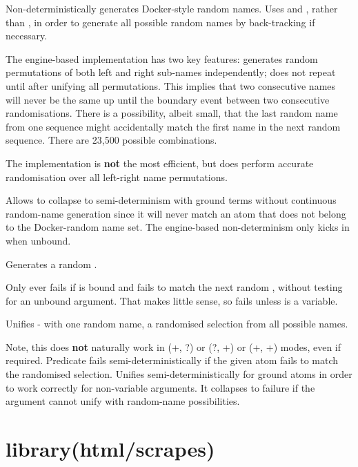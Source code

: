 \begin{description}
Non-deterministically generates Docker-style random names. Uses
 and , rather than , in
order to generate all possible random names by back-tracking if
necessary.

The engine-based implementation has two key features: generates
random permutations of both left and right sub-names independently;
does not repeat until after unifying all permutations. This implies
that two consecutive names will never be the same up until the
boundary event between two consecutive randomisations. There is a
possibility, albeit small, that the last random name from one
sequence might accidentally match the first name in the next random
sequence. There are 23,500 possible combinations.

The implementation is \textbf{not} the most efficient, but does perform
accurate randomisation over all left-right name permutations.

Allows  to collapse to semi-determinism with ground terms
without continuous random-name generation since it will never match
an atom that does not belong to the Docker-random name set. The
engine-based non-determinism only kicks in when  unbound.

Generates a random .

Only ever fails if  is bound and fails to match the next random
, without testing for an unbound argument. That makes little
sense, so fails unless  is a variable.

Unifies - with one random name, a randomised selection from
all possible names.

Note, this does \textbf{not} naturally work in (+, ?) or (?, +) or (+, +)
modes, even if required. Predicate  fails
semi-deterministically if the given atom fails to match the
randomised selection. Unifies semi-deterministically for ground
atoms in order to work correctly for non-variable arguments. It
collapses to failure if the argument cannot unify with random-name
possibilities.
\end{description}

\chapter{library(html/scrapes)}\label{sec:scrapes}

